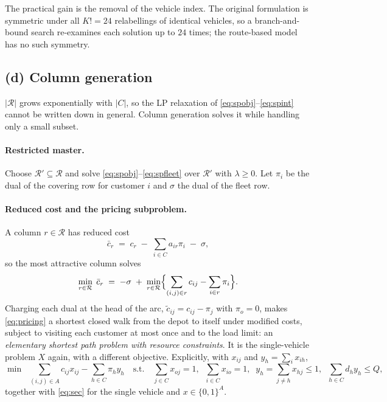 \documentclass[11pt]{article}
\DeclareMathOperator*{\minimize}{min}
\begin{document}
The practical gain is the removal of the vehicle index. The original
formulation is symmetric under all $K! = 24$ relabellings of identical
vehicles, so a branch-and-bound search re-examines each solution up to
$24$ times; the route-based model has no such symmetry.

\subsection{(d) Column generation}

$|\mathcal{R}|$ grows exponentially with $|C|$, so the LP relaxation of
\eqref{eq:spobj}--\eqref{eq:spint} cannot be written down in general.
Column generation solves it while handling only a small subset.

\paragraph{Restricted master.} Choose
$\mathcal{R}' \subseteq \mathcal{R}$ and solve
\eqref{eq:spobj}--\eqref{eq:spfleet} over $\mathcal{R}'$ with
$\lambda \ge 0$. Let $\pi_i$ be the dual of the covering row for
customer $i$ and $\sigma$ the dual of the fleet row.

\paragraph{Reduced cost and the pricing subproblem.} A column
$r \in \mathcal{R}$ has reduced cost
\[
  \bar{c}_r \;=\; c_r \;-\; \sum_{i \in C} a_{ir}\pi_i \;-\; \sigma ,
\]
so the most attractive column solves
\begin{equation}\label{eq:pricing}
  \minimize_{r \in \mathcal{R}}\; \bar{c}_r
  \;=\; -\sigma \;+\;
  \minimize_{r \in \mathcal{R}}
  \Bigl\{ \sum_{(i,j) \in r} c_{ij} - \sum_{i \in r} \pi_i \Bigr\} .
\end{equation}
Charging each dual at the head of the arc, $\tilde{c}_{ij} =
c_{ij} - \pi_j$ with $\pi_o = 0$, makes \eqref{eq:pricing} a shortest
closed walk from the depot to itself under modified costs, subject to
visiting each customer at most once and to the load limit: an
\emph{elementary shortest path problem with resource constraints}. It
is the single-vehicle problem $X$ again, with a different objective.
Explicitly, with $x_{ij}$ and $y_h = \sum_i x_{ih}$,
\[
  \minimize \;\; \sum_{(i,j) \in A} c_{ij} x_{ij}
      - \sum_{h \in C} \pi_h y_h
  \quad\text{s.t.}\quad
  \sum_{j \in C} x_{oj} = 1,\;\;
  \sum_{i \in C} x_{io} = 1,\;\;
  y_h = \!\!\sum_{j \neq h}\!\! x_{hj} \le 1,\;\;
  \sum_{h \in C} d_h y_h \le Q,
\]
together with \eqref{eq:sec} for the single vehicle and
$x \in \{0,1\}^A$.
\end{document}
